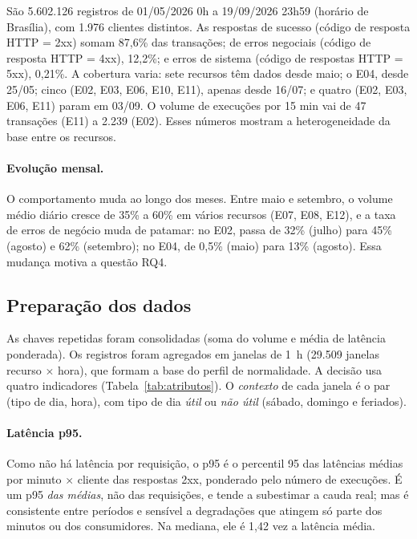 \documentclass[sigconf,nonacm]{acmart}
\begin{document}
São 5.602.126 registros de 01/05/2026 0h a 19/09/2026 23h59 (horário de Brasília), com 1.976 clientes distintos. As respostas de sucesso (código de resposta HTTP = 2xx) somam 87,6\% das transações; de erros negociais (código de resposta HTTP = 4xx), 12,2\%; e erros de sistema (código de respostas HTTP = 5xx), 0,21\%. A cobertura varia: sete recursos têm dados desde maio; o E04, desde 25/05; cinco (E02, E03, E06, E10, E11), apenas desde 16/07; e quatro (E02, E03, E06, E11) param em 03/09. O volume de execuções por 15 min vai de 47 transações (E11) a 2.239 (E02). Esses números mostram a heterogeneidade da base entre os recursos. 

\paragraph{Evolução mensal.} O comportamento muda ao longo dos meses. Entre maio e setembro, o volume médio diário cresce de 35\% a 60\% em vários recursos (E07, E08, E12), e a taxa de erros de negócio muda de patamar: no E02, passa de 32\% (julho) para 45\% (agosto) e 62\% (setembro); no E04, de 0,5\% (maio) para 13\% (agosto). Essa mudança motiva a questão RQ4.

\subsection{Preparação dos dados}
As chaves repetidas foram consolidadas (soma do volume e média de latência ponderada). Os registros foram agregados em janelas de 1~h (29.509 janelas recurso $\times$ hora), que formam a base do perfil de normalidade. A decisão usa quatro indicadores (Tabela~\ref{tab:atributos}). O \emph{contexto} de cada janela é o par (tipo de dia, hora), com tipo de dia \emph{útil} ou \emph{não útil} (sábado, domingo e feriados).

\paragraph{Latência p95.} Como não há latência por requisição, o p95 é o percentil 95 das latências médias por minuto $\times$ cliente das respostas 2xx, ponderado pelo número de execuções. É um p95 \emph{das médias}, não das requisições, e tende a subestimar a cauda real; mas é consistente entre períodos e sensível a degradações que atingem só parte dos minutos ou dos consumidores. Na mediana, ele é 1,42 vez a latência média.
\end{document}
